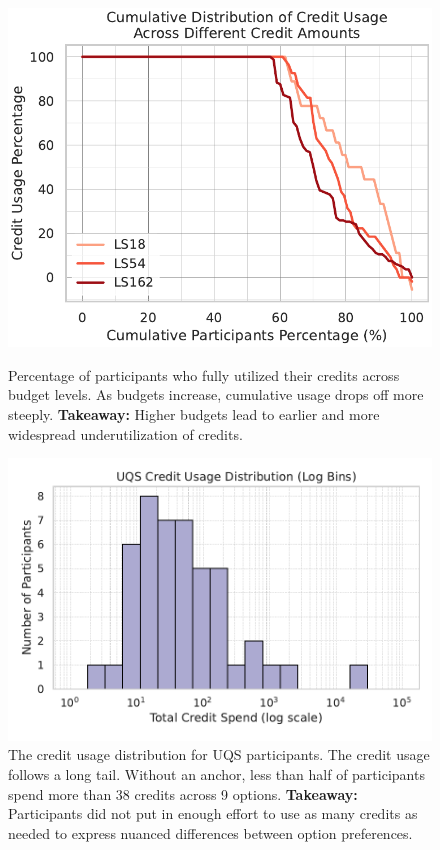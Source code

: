 {\begin{figure}[ht]
  \begin{minipage}[t]{0.48\textwidth}
    \centering
    \includegraphics[width=\textwidth]{content/image/cumulative_distribution_credit_usage.pdf}
    \caption[]{
    Percentage of participants who fully utilized their credits across budget levels. As budgets increase, cumulative usage drops off more steeply.
    \textbf{Takeaway:} Higher budgets lead to earlier and more widespread underutilization of credits.
    }   
    \label{fig:credit_usage_descending}
  \end{minipage}
  \hfill
  \begin{minipage}[t]{0.48\textwidth}
    \centering
    \includegraphics[width=\textwidth]{content/image/uqs_credit_usage_distribution_logbins.pdf}
    \caption[]{The credit usage distribution for UQS participants. The credit usage follows a long tail. Without an anchor, less than half of participants spend more than 38 credits across 9 options. \textbf{Takeaway:} Participants did not put in enough effort to use as many credits as needed to express nuanced differences between option preferences.}
    \label{fig:uqs_usage}
  \end{minipage}

\end{figure}}



